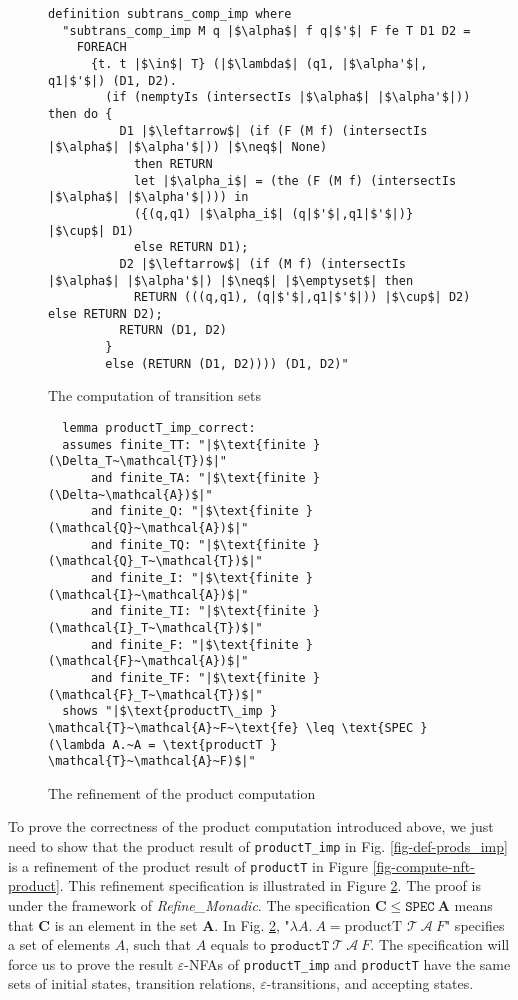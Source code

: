 \documentclass[a4paper,UKenglish,cleveref, autoref, anonymous, thm-restate]{lipics-v2021}
\begin{document}
\begin{figure}[hbt!]
	\begin{lstlisting}
definition subtrans_comp_imp where
  "subtrans_comp_imp M q |$\alpha$| f q|$'$| F fe T D1 D2 =
    FOREACH
      {t. t |$\in$| T} (|$\lambda$| (q1, |$\alpha'$|, q1|$'$|) (D1, D2).
        (if (nemptyIs (intersectIs |$\alpha$| |$\alpha'$|)) then do {
          D1 |$\leftarrow$| (if (F (M f) (intersectIs |$\alpha$| |$\alpha'$|)) |$\neq$| None) 
            then RETURN 
            let |$\alpha_i$| = (the (F (M f) (intersectIs |$\alpha$| |$\alpha'$|))) in
            ({(q,q1) |$\alpha_i$| (q|$'$|,q1|$'$|)} |$\cup$| D1)
            else RETURN D1);
          D2 |$\leftarrow$| (if (M f) (intersectIs |$\alpha$| |$\alpha'$|) |$\neq$| |$\emptyset$| then 
            RETURN (((q,q1), (q|$'$|,q1|$'$|)) |$\cup$| D2) else RETURN D2);
          RETURN (D1, D2)
        }
        else (RETURN (D1, D2)))) (D1, D2)"
    \end{lstlisting}
    \caption{The computation of transition sets}
    \label{fig-def-subtrans_comp}
    \end{figure}


 

  \begin{figure}[hbt!]
    \begin{lstlisting}
  lemma productT_imp_correct:
  assumes finite_TT: "|$\text{finite } (\Delta_T~\mathcal{T})$|"    
      and finite_TA: "|$\text{finite } (\Delta~\mathcal{A})$|"
      and finite_Q: "|$\text{finite } (\mathcal{Q}~\mathcal{A})$|"
      and finite_TQ: "|$\text{finite } (\mathcal{Q}_T~\mathcal{T})$|"
      and finite_I: "|$\text{finite } (\mathcal{I}~\mathcal{A})$|"
      and finite_TI: "|$\text{finite } (\mathcal{I}_T~\mathcal{T})$|"
      and finite_F: "|$\text{finite } (\mathcal{F}~\mathcal{A})$|"
      and finite_TF: "|$\text{finite } (\mathcal{F}_T~\mathcal{T})$|"
  shows "|$\text{productT\_imp } \mathcal{T}~\mathcal{A}~F~\text{fe} \leq \text{SPEC } (\lambda A.~A = \text{productT } \mathcal{T}~\mathcal{A}~F)$|"
  \end{lstlisting}
  \caption{The refinement of the product computation}
  \label{fig-def-productT_imp_correct}
  \end{figure}

  To prove the correctness of the product computation introduced above, we just need to show that the product result of \texttt{productT\_imp} in Fig. \ref{fig-def-prods_imp} is a refinement of the product result of \texttt{productT} in Figure \ref{fig-compute-nft-product}. This refinement specification is illustrated in Figure \ref{fig-def-productT_imp_correct}. The proof is under the framework of \emph{Refine\_Monadic}. The specification $\mathbf{C} \leq\texttt{SPEC}~\mathbf{A}$ means that $\mathbf{C}$ is an element in the set $\mathbf{A}$. In Fig. \ref{fig-def-productT_imp_correct}, "$\lambda A.~A = \text{productT } \mathcal{T}~\mathcal{A}~F$" specifies a set of elements $A$, such that $A$ equals to $\texttt{productT}~\mathcal{T}~\mathcal{A}~F$. 
  The specification will force us to prove the result $\varepsilon$-NFAs of \texttt{productT\_imp}  and \texttt{productT} have the same sets of initial states, transition relations, $\varepsilon$-transitions, and accepting states.
\end{document}
